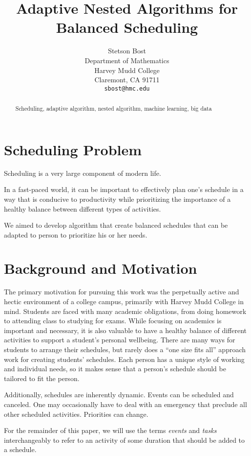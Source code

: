 \documentclass{article}
\title{Adaptive Nested Algorithms for Balanced Scheduling}
\author{
  Stetson Bost\\
  Department of Mathematics\\
  Harvey Mudd College\\
  Claremont, CA 91711 \\
  \texttt{sbost@hmc.edu}\\
}
\newcommand{\todo}[1]{}
\begin{document}

\maketitle

\begin{abstract}
Scheduling, adaptive algorithm, nested algorithm, machine learning, big data
\end{abstract}

\section{Scheduling Problem}
	Scheduling is a very large component of modern life.
	\todo{``Find details about scheduling, wellness, (work-life) balance, etc.''}
	In a fast-paced world, it can be important to effectively plan one's schedule in a way that is conducive to productivity while prioritizing the importance of a healthy balance between different types of activities. 

	We aimed to develop algorithm that create balanced schedules that can be adapted to person to prioritize his or her needs.


\section{Background and Motivation}
	The primary motivation for pursuing this work was the perpetually active and hectic environment of a college campus, primarily with Harvey Mudd College in mind.
	Students are faced with many academic obligations, from doing homework to attending class to studying for exams.
	While focusing on academics is important and necessary, it is also valuable to have a healthy balance of different activities to support a student's personal wellbeing.
	There are many ways for students to arrange their schedules, but rarely does a ``one size fits all'' approach work for creating students' schedules.
	Each person has a unique style of working and individual needs, so it makes sense that a person's schedule should be tailored to fit the person.

	Additionally, schedules are inherently dynamic.
	Events can be scheduled and canceled.
	One may occasionally have to deal with an emergency that preclude all other scheduled activities.
	Priorities can change.
	\todo{``expand this section''}

	For the remainder of this paper, we will use the terms \emph{events} and \emph{tasks} interchangeably to refer to an activity of some duration that should be added to a schedule.
\end{document}

